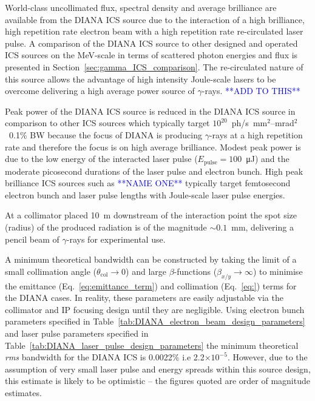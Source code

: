 \documentclass[../main.tex]{subfiles}
\begin{document}
World-class uncollimated flux, spectral density and average brilliance are available from the DIANA ICS source due to the interaction of a high brilliance, high repetition rate electron beam with a high repetition rate re-circulated laser pulse. A comparison of the DIANA ICS source to other designed and operated ICS sources on the \si{\mega\electronvolt}-scale in terms of scattered photon energies and flux is presented in Section~\ref{sec:gamma_ICS_comparison}. The re-circulated nature of this source allows the advantage of high intensity Joule-scale lasers to be overcome delivering a high average power source of $\gamma$-rays. 
\textcolor{blue}{**ADD TO THIS**}

Peak power of the DIANA ICS source is reduced in the DIANA ICS source in comparison to other ICS sources \cite{} which typically target $10^{20}$~ph/\si{\second}~\si{\milli\meter}$^{2}$--\si{\milli\radian}$^{2}$~0.1\% BW because the focus of DIANA is producing $\gamma$-rays at a high repetition rate and therefore the focus is on high average brilliance. Modest peak power is due to the low energy of the interacted laser pulse ($E_{\mathrm{pulse}} = 100$~\si{\micro\joule}) and the moderate picosecond durations of the laser pulse and electron bunch. High peak brilliance ICS sources such as \textcolor{blue}{**NAME ONE**} typically target femtosecond electron bunch and laser pulse lengths with Joule-scale laser pulse energies. 

At a collimator placed 10~\si{\meter} downstream of the interaction point the spot size (radius) of the produced radiation is of the magnitude $\sim0.1$~\si{\milli\meter}, delivering a pencil beam of $\gamma$-rays for experimental use.

A minimum theoretical bandwidth can be constructed by taking the limit of a small collimation angle ($\theta_{\mathrm{col}}\rightarrow 0$) and large $\beta$-functions ($\beta_{x/y}\rightarrow\infty$) to minimise the emittance (Eq.~\ref{eq:emittance_term}) and collimation (Eq.~\ref{eq:}) terms for the DIANA cases. In reality, these parameters are easily adjustable via the collimator and IP focusing design until they are negligible. Using electron bunch parameters specified in Table~\ref{tab:DIANA_electron_beam_design_parameters} and laser pulse parameters specified in Table~\ref{tab:DIANA_laser_pulse_design_parameters} the minimum theoretical \textit{rms} bandwidth for the DIANA ICS is 0.0022\% i.e 2.2$\times 10^{-5}$. However, due to the assumption of very small laser pulse and energy spreads within this source design, this estimate is likely to be optimistic -- the figures quoted are order of magnitude estimates. 
\end{document}
